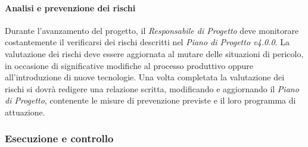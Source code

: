 \paragraph{Analisi e prevenzione dei rischi}
Durante l'avanzamento del progetto, il \textit{Responsabile di Progetto} deve monitorare costantemente il verificarsi dei rischi descritti nel \textit{Piano di Progetto v4.0.0}. La valutazione dei rischi deve essere aggiornata al mutare delle situazioni di pericolo, in occasione di significative modifiche al processo produttivo oppure all'introduzione di nuove tecnologie. Una volta completata la valutazione dei rischi si dovrà redigere una relazione scritta, modificando e aggiornando il \textit{Piano di Progetto}, contenente le misure di prevenzione previste e il loro programma di attuazione.

\newpage
\subsubsection{Esecuzione e controllo}
